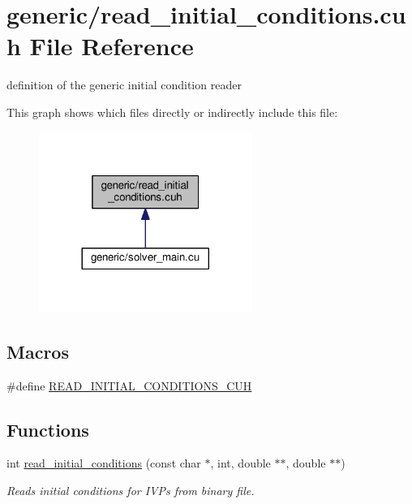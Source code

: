 \hypertarget{read__initial__conditions_8cuh}{}\section{generic/read\+\_\+initial\+\_\+conditions.cuh File Reference}
\label{read__initial__conditions_8cuh}


definition of the generic initial condition reader  


This graph shows which files directly or indirectly include this file\+:\nopagebreak
\begin{figure}[H]
\begin{center}
\leavevmode
\includegraphics[width=197pt]{read__initial__conditions_8cuh__dep__incl}
\end{center}
\end{figure}
\subsection*{Macros}
\begin{DoxyCompactItemize}
\item 
\#define \hyperlink{read__initial__conditions_8cuh_aa94bd31760d037d12c0cfce818fa6ca4}{R\+E\+A\+D\+\_\+\+I\+N\+I\+T\+I\+A\+L\+\_\+\+C\+O\+N\+D\+I\+T\+I\+O\+N\+S\+\_\+\+C\+UH}
\end{DoxyCompactItemize}
\subsection*{Functions}
\begin{DoxyCompactItemize}
\item 
int \hyperlink{read__initial__conditions_8cuh_af316c999bd8f21073480df848cca5225}{read\+\_\+initial\+\_\+conditions} (const char $\ast$, int, double $\ast$$\ast$, double $\ast$$\ast$)
\begin{DoxyCompactList}\small\item\em Reads initial conditions for I\+V\+Ps from binary file. \end{DoxyCompactList}\end{DoxyCompactItemize}


